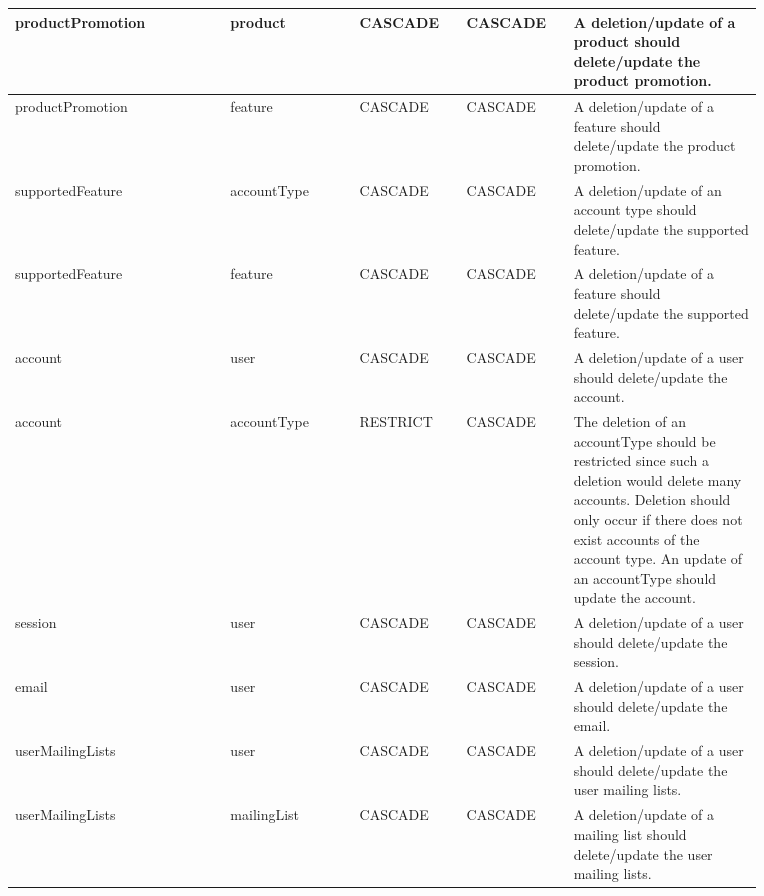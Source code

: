 \begin{spacing}{1.25}
\begin{longtable}{ | p{0.25\linewidth} | p{0.15\linewidth} | p{0.126\linewidth} | p{0.128\linewidth} | p{0.22\linewidth} | }
productPromotion			& product			& CASCADE	& CASCADE 	& A deletion/update of a product should delete/update the product promotion.\\\hline
productPromotion			& feature			& CASCADE	& CASCADE 	& A deletion/update of a feature should delete/update the product promotion.\\\hline
supportedFeature			& accountType		& CASCADE	& CASCADE 	& A deletion/update of an account type should delete/update the supported feature.\\\hline
supportedFeature			& feature			& CASCADE	& CASCADE 	& A deletion/update of a feature should delete/update the supported feature.\\\hline
account						& user				& CASCADE	& CASCADE 	& A deletion/update of a user should delete/update the account.\\\hline
account						& accountType		& RESTRICT	& CASCADE 	& The deletion of an accountType should be restricted since such a deletion would delete many accounts. Deletion should only occur if there does not exist accounts of the account type. An update of an accountType should update the account.\\\hline
session						& user				& CASCADE	& CASCADE 	& A deletion/update of a user should delete/update the session.\\\hline
email						& user				& CASCADE	& CASCADE 	& A deletion/update of a user should delete/update the email.\\\hline
userMailingLists			& user				& CASCADE	& CASCADE 	& A deletion/update of a user should delete/update the user mailing lists.\\\hline
userMailingLists			& mailingList		& CASCADE	& CASCADE 	& A deletion/update of a mailing list should delete/update the user mailing lists.\\\hline
\end{longtable}
\end{spacing}